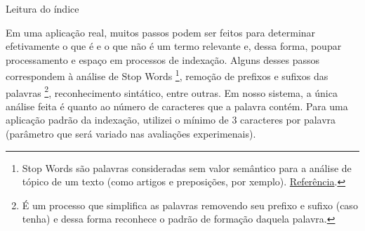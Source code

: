 \documentclass[12pt]{article}
\begin{document}

\begin{algorithm}[h!]
\begin{footnotesize}
\caption{Leitura do índice}
\end{footnotesize}
\end{algorithm}

Em uma aplicação real, muitos passos podem ser feitos para determinar
efetivamente o que é e o que não é um termo relevante e, dessa forma, poupar
processamento e espaço em processos de indexação. Alguns desses passos
correspondem à análise de Stop Words \footnote{Stop Words são palavras consideradas sem valor
semântico para a análise de tópico de um texto (como artigos e preposições, por
xemplo). \href{http://searchenginewatch.com/2156061}{Referência}.}, remoção de
prefixos e sufixos das palavras \footnote{É um processo que simplifica as
palavras removendo seu prefixo e sufixo (caso tenha) e dessa forma reconhece o
padrão de formação daquela palavra.}, reconhecimento sintático, entre outras. 
Em nosso sistema, a única análise feita é quanto ao número de caracteres que a 
palavra contém. Para uma aplicação padrão da indexação, utilizei o mínimo de 3 
caracteres por palavra (parâmetro que será variado nas avaliações experimenais).
\end{document}
